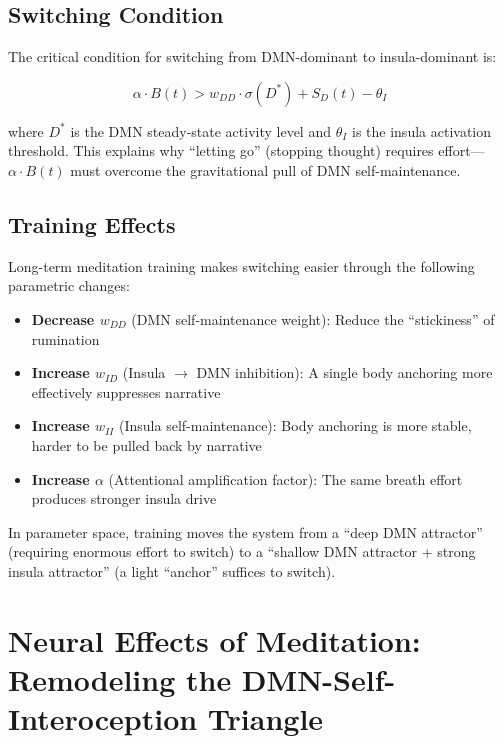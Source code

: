 \documentclass[11pt,a4paper]{article}
\begin{document}
\subsection{Switching Condition}

The critical condition for switching from DMN-dominant to insula-dominant is:

\begin{equation}
\alpha \cdot B(t) > w_{DD} \cdot \sigma(D^*) + S_D(t) - \theta_I
\label{eq:switch_condition}
\end{equation}

where $D^*$ is the DMN steady-state activity level and $\theta_I$ is the insula activation threshold. This explains why ``letting go'' (stopping thought) requires effort---$\alpha \cdot B(t)$ must overcome the gravitational pull of DMN self-maintenance.

\subsection{Training Effects}

Long-term meditation training makes switching easier through the following parametric changes:

\begin{itemize}[nosep]
    \item \textbf{Decrease $w_{DD}$} (DMN self-maintenance weight): Reduce the ``stickiness'' of rumination
    \item \textbf{Increase $w_{ID}$} (Insula $\rightarrow$ DMN inhibition): A single body anchoring more effectively suppresses narrative
    \item \textbf{Increase $w_{II}$} (Insula self-maintenance): Body anchoring is more stable, harder to be pulled back by narrative
    \item \textbf{Increase $\alpha$} (Attentional amplification factor): The same breath effort produces stronger insula drive
\end{itemize}

In parameter space, training moves the system from a ``deep DMN attractor'' (requiring enormous effort to switch) to a ``shallow DMN attractor + strong insula attractor'' (a light ``anchor'' suffices to switch).

\section{Neural Effects of Meditation: Remodeling the DMN-Self-Interoception Triangle}
\end{document}
